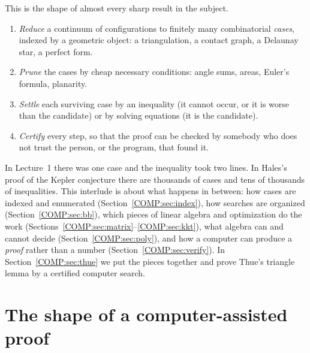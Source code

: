 This is the shape of almost every sharp result in the subject.
\begin{enumerate}[label=(\arabic*)]
\item \emph{Reduce} a continuum of configurations to finitely many combinatorial \emph{cases}, indexed by
  a geometric object: a triangulation, a contact graph, a Delaunay star, a perfect form.
\item \emph{Prune} the cases by cheap necessary conditions: angle sums, areas, Euler's formula, planarity.
\item \emph{Settle} each surviving case by an inequality (it cannot occur, or it is worse than the
  candidate) or by solving equations (it is the candidate).
\item \emph{Certify} every step, so that the proof can be checked by somebody who does not trust the
  person, or the program, that found it.
\end{enumerate}
In Lecture~1 there was one case and the inequality took two lines. In Hales's proof of the Kepler
conjecture there are thousands of cases and tens of thousands of inequalities. This interlude is about
what happens in between: how cases are indexed and enumerated (Section~\ref{COMP:sec:index}), how
searches are organized (Section~\ref{COMP:sec:bb}), which pieces of linear algebra and optimization do
the work (Sections~\ref{COMP:sec:matrix}--\ref{COMP:sec:kkt}), what algebra can and cannot decide
(Section~\ref{COMP:sec:poly}), and how a computer can produce a \emph{proof} rather than a number
(Section~\ref{COMP:sec:verify}). In Section~\ref{COMP:sec:thue} we put the pieces together and prove
Thue's triangle lemma by a certified computer search.

\section{The shape of a computer-assisted proof}
\label{COMP:sec:shape}

